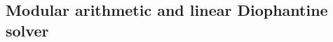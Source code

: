 \documentclass[12pt]{extarticle}
\begin{document}
\begin{multicols*}{2}
\subsection{Modular arithmetic and linear Diophantine solver} %


% 

% 


% 


\end{multicols*}
\end{document}

